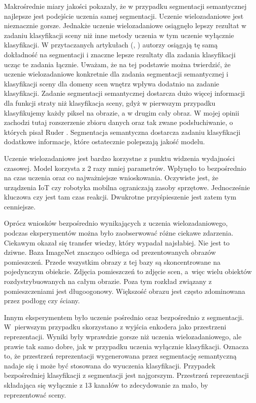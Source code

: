 Makrośrednie miary jakości pokazały, że w przypadku segmentacji semantycznej najlepsze jest podejście uczenia samej segmentacji. Uczenie wielozadaniowe jest nieznacznie gorsze. Jednakże uczenie wielozadaniowe osiągnęło lepszy rezultat w zadaniu klasyfikacji sceny niż inne metody uczenia w tym uczenie wyłącznie klasyfikacji. W przytaczanych artykułach (\cite{mehta2018net}, \cite{9892852}) autorzy osiągają tę samą dokładność na segmentacji i znaczne lepsze rezultaty dla zadania klasyfikacji ucząc te zadania łącznie. Uważam, że na tej podstawie można twierdzić, że uczenie wielozadaniowe konkretnie dla zadania segmentacji semantycznej i klasyfikacji sceny dla domeny scen wnętrz wpływa dodatnio na zadanie klasyfikacji. Zadanie segmentacji semantycznej dostarcza dużo więcej informacji dla funkcji straty niż klasyfikacja sceny, gdyż w pierwszym przypadku klasyfikujemy każdy piksel na obrazie, a w drugim cały obraz. W mojej opinii zachodzi tutaj rozszerzenie zbioru danych oraz tak zwane podsłuchiwanie, o których pisał Ruder \cite{ruder2017overview}. Segmentacja semantyczna dostarcza zadaniu klasyfikacji dodatkowe informacje, które ostatecznie polepszają jakość modelu.

Uczenie wielozadaniowe jest bardzo korzystne z punktu widzenia wydajności czasowej. Model korzysta z 2 razy mniej parametrów. Wpłynęło to bezpośrednio na czas uczenia oraz co najważniejsze wnioskowania. Oczywiste jest, że urządzenia IoT czy robotyka mobilna ograniczają zasoby sprzętowe. Jednocześnie kluczowa czy jest tam czas reakcji. Dwukrotne przyśpieszenie jest zatem tym cenniejsze.

Oprócz wniosków bezpośrednio wynikających z uczenia wielozadaniowego, podczas eksperymentów można było zaobserwować różne ciekawe zdarzenia. Ciekawym okazał się transfer wiedzy, który wypadał najsłabiej. Nie jest to dziwne. Baza ImageNet znacząco odbiega od prezentowanych obrazów pomieszczeń. Przede wszystkim obrazy z tej bazy są skoncentrowane na pojedynczym obiekcie. Zdjęcia pomieszczeń to zdjęcie scen, a~więc wielu obiektów rozdystrybuowanych na całym obrazie. Poza tym rozkład związany z pomieszczeniami jest długoogonowy. Większość obrazu jest często zdominowana przez podłogę czy ściany.

Innym eksperymentem było uczenie pośrednio oraz bezpośrednio z segmentacji. W~pierwszym przypadku skorzystano z wyjścia enkodera jako przestrzeni reprezentacji. Wyniki były wprawdzie gorsze niż uczenia wielozadaniowego, ale prawie tak samo dobre, jak w przypadku uczenia wyłącznie klasyfikacji. Oznacza to, że przestrzeń reprezentacji wygenerowana przez segmentację semantyczną nadaje się i może być stosowana do wyuczenia klasyfikacji. Przypadek bezpośredniej klasyfikacji z segmentacji jest najgorszym. Przestrzeń reprezentacji składająca się wyłącznie z 13 kanałów to zdecydowanie za mało, by reprezentować sceny.

